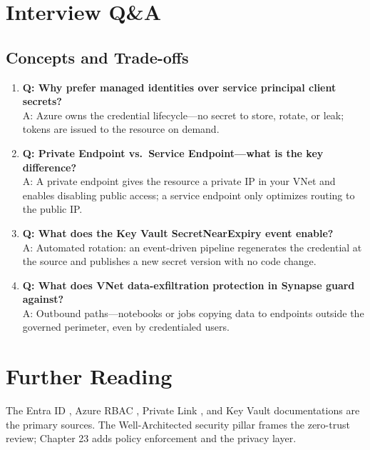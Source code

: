 \section{Interview Q\&A}
\subsection{Concepts and Trade-offs}
\begin{enumerate}
    \item \textbf{Q: Why prefer managed identities over service principal client secrets?}\\
    A: Azure owns the credential lifecycle---no secret to store, rotate, or leak; tokens are issued to the resource on demand.
    \item \textbf{Q: Private Endpoint vs.\ Service Endpoint---what is the key difference?}\\
    A: A private endpoint gives the resource a private IP in your VNet and enables disabling public access; a service endpoint only optimizes routing to the public IP.
    \item \textbf{Q: What does the Key Vault SecretNearExpiry event enable?}\\
    A: Automated rotation: an event-driven pipeline regenerates the credential at the source and publishes a new secret version with no code change.
    \item \textbf{Q: What does VNet data-exfiltration protection in Synapse guard against?}\\
    A: Outbound paths---notebooks or jobs copying data to endpoints outside the governed perimeter, even by credentialed users.
\end{enumerate}

\section{Further Reading}
The Entra ID \cite{microsoft2025entra}, Azure RBAC \cite{microsoft2025rbac}, Private Link \cite{microsoft2025privateLink}, and Key Vault \cite{microsoft2025keyVault} documentations are the primary sources. The Well-Architected security pillar \cite{microsoft2025wellarchitected} frames the zero-trust review; Chapter 23 adds policy enforcement and the privacy layer.

